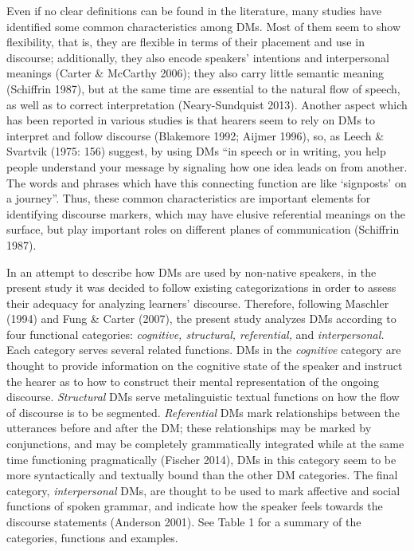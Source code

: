 \documentclass[12pt]{article}
\newenvironment{styleStandard}{\setlength\leftskip{0cm}\setlength\rightskip{0cm plus 1fil}\setlength\parindent{0cm}\setlength\parfillskip{0pt plus 1fil}\setlength\parskip{0in plus 1pt}\writerlistparindent\writerlistleftskip\leavevmode\normalfont\normalsize\writerlistlabel\ignorespaces}{\unskip\vspace{0.111in plus 0.0111in}\par}
\newcommand\writerlistleftskip{}
\newcommand\writerlistparindent{}
\newcommand\writerlistlabel{}
\begin{document}
\begin{styleStandard}
Even if no clear definitions can be found in the literature, many studies have identified some common characteristics among DMs. Most of them seem to show flexibility, that is, they are flexible in terms of their placement and use in discourse; additionally, they also encode speakers’ intentions and interpersonal meanings (Carter \& McCarthy 2006); they also carry little semantic meaning (Schiffrin 1987), but at the same time are essential to the natural flow of speech, as well as to correct interpretation (Neary-Sundquist 2013). Another aspect which has been reported in various studies is that hearers seem to rely on DMs to interpret and follow discourse (Blakemore 1992; Aijmer 1996), so, as Leech \& Svartvik (1975: 156) suggest, by using DMs “in speech or in writing, you help people understand your message by signaling how one idea leads on from another. The words and phrases which have this connecting function are like ‘signposts’ on a journey”. Thus, these common characteristics are important elements for identifying discourse markers, which may have elusive referential meanings on the surface, but play important roles on different planes of communication (Schiffrin 1987).
\end{styleStandard}

\begin{styleStandard}
In an attempt to describe how DMs are used by non-native speakers, in the present study it was decided to follow existing categorizations in order to assess their adequacy for analyzing learners’ discourse. Therefore, following Maschler (1994) and Fung \& Carter (2007), the present study analyzes DMs according to four functional categories: \textit{cognitive, structural, referential, }and\textit{ interpersonal. }Each category serves several related functions. DMs in the \textit{cognitive} category are thought to provide information on the cognitive state of the speaker and instruct the hearer as to how to construct their mental representation of the ongoing discourse. \textit{Structural }DMs serve metalinguistic textual functions on how the flow of discourse is to be segmented. \textit{Referential} DMs mark relationships between the utterances before and after the DM; these relationships may be marked by conjunctions, and may be completely grammatically integrated while at the same time functioning pragmatically (Fischer 2014), DMs in this category seem to be more syntactically and textually bound than the other DM categories. The final category, \textit{interpersonal} DMs, are thought to be used to mark affective and social functions of spoken grammar, and indicate how the speaker feels towards the discourse statements (Anderson 2001). See Table 1 for a summary of the categories, functions and examples.
\end{styleStandard}
\end{document}
